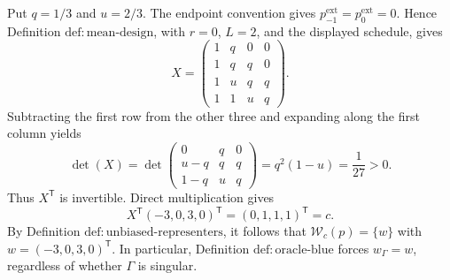 Put \(q=1/3\) and \(u=2/3\).  The endpoint convention gives \(p^{\mathrm{ext}}_{-1}=p^{\mathrm{ext}}_0=0\).  Hence Definition \(\mathrm{def:mean\text{-}design}\), with \(r=0\), \(L=2\), and the displayed schedule, gives
\[
X=
\begin{pmatrix}
1&q&0&0\\
1&q&q&0\\
1&u&q&q\\
1&1&u&q
\end{pmatrix}.
\]
Subtracting the first row from the other three and expanding along the first column yields
\[
\det(X)=
\det\!\begin{pmatrix}
0&q&0\\
u-q&q&q\\
1-q&u&q
\end{pmatrix}
=q^2(1-u)=\frac1{27}>0.
\]
Thus \(X^{\mathsf T}\) is invertible.  Direct multiplication gives
\[
X^{\mathsf T}(-3,0,3,0)^{\mathsf T}
=(0,1,1,1)^{\mathsf T}=c.
\]
By Definition \(\mathrm{def:unbiased\text{-}representers}\), it follows that
\(\mathcal W_c(p)=\{w\}\) with \(w=(-3,0,3,0)^{\mathsf T}\).  In particular, Definition \(\mathrm{def:oracle\text{-}blue}\) forces \(w_\Gamma=w\), regardless of whether \(\Gamma\) is singular.

